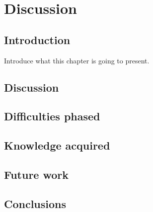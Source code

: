 \chapter{Discussion}

\section{Introduction}
Introduce what this chapter is going to present.
\section{Discussion}

\section{Difficulties phased}

\section{Knowledge acquired}

\section{Future work}

\section{Conclusions}
